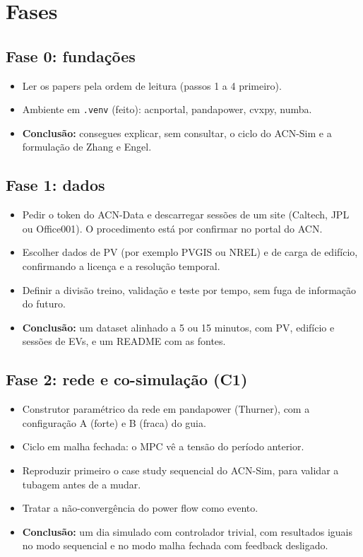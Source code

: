 \documentclass[11pt,a4paper]{article}
\begin{document}
\section{Fases}

\subsection*{Fase 0: fundações}
\begin{itemize}
  \item Ler os papers pela ordem de leitura (passos 1 a 4 primeiro).
  \item Ambiente em \texttt{.venv} (feito): acnportal, pandapower, cvxpy, numba.
  \item \textbf{Conclusão:} consegues explicar, sem consultar, o ciclo do ACN-Sim e a formulação de Zhang e Engel.
\end{itemize}

\subsection*{Fase 1: dados}
\begin{itemize}
  \item Pedir o token do ACN-Data e descarregar sessões de um site (Caltech, JPL ou Office001). O procedimento está por confirmar no portal do ACN.
  \item Escolher dados de PV (por exemplo PVGIS ou NREL) e de carga de edifício, confirmando a licença e a resolução temporal.
  \item Definir a divisão treino, validação e teste por tempo, sem fuga de informação do futuro.
  \item \textbf{Conclusão:} um dataset alinhado a 5 ou 15 minutos, com PV, edifício e sessões de EVs, e um README com as fontes.
\end{itemize}

\subsection*{Fase 2: rede e co-simulação (C1)}
\begin{itemize}
  \item Construtor paramétrico da rede em pandapower (Thurner), com a configuração A (forte) e B (fraca) do guia.
  \item Ciclo em malha fechada: o MPC vê a tensão do período anterior.
  \item Reproduzir primeiro o case study sequencial do ACN-Sim, para validar a tubagem antes de a mudar.
  \item Tratar a não-convergência do power flow como evento.
  \item \textbf{Conclusão:} um dia simulado com controlador trivial, com resultados iguais no modo sequencial e no modo malha fechada com feedback desligado.
\end{itemize}
\end{document}
